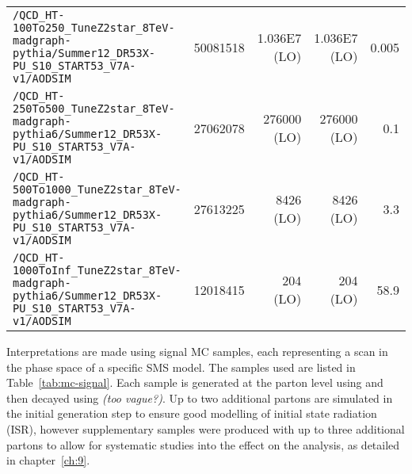 \begin{landscape}
\begin{center}
\begin{table}[ht]
\begin{tabular}{ lrrrr }
        \verb!/QCD_HT-100To250_TuneZ2star_8TeV-madgraph-pythia/Summer12_DR53X-PU_S10_START53_V7A-v1/AODSIM!       & 50081518 & 1.036E7 (LO) & 1.036E7 (LO) & 0.005   \\
        \verb!/QCD_HT-250To500_TuneZ2star_8TeV-madgraph-pythia6/Summer12_DR53X-PU_S10_START53_V7A-v1/AODSIM!      & 27062078 & 276000 (LO) & 276000 (LO) & 0.1     \\
        \verb!/QCD_HT-500To1000_TuneZ2star_8TeV-madgraph-pythia6/Summer12_DR53X-PU_S10_START53_V7A-v1/AODSIM!     & 27613225 & 8426 (LO)   & 8426   (LO) & 3.3     \\
        \verb!/QCD_HT-1000ToInf_TuneZ2star_8TeV-madgraph-pythia6/Summer12_DR53X-PU_S10_START53_V7A-v1/AODSIM!     & 12018415 & 204 (LO)    & 204    (LO) & 58.9    \\
        \hline
      \end{tabular}
    \end{table}
  \end{center}
\end{landscape}

Interpretations are made using signal MC samples, each representing a scan in 
the phase space of a specific SMS model. The samples used are listed in
Table~\ref{tab:mc-signal}. Each sample is generated at the parton level using \MADGRAPH and then
decayed using \PYTHIASIX \emph{(too vague?)}. Up to two additional partons are simulated 
in the initial generation step to ensure good modelling of initial state 
radiation (ISR), however supplementary samples were produced with up to three
additional partons to allow for systematic studies into the effect on the 
analysis, as detailed in chapter~\ref{ch:9}.

